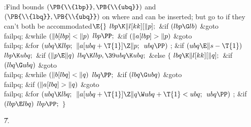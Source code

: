 \Y\B\4:Find bounds $(\PB{\\{lbp}},\PB{\\{ubq}})$ and $(\PB{\\{lbq}},\PB{%
\\{ubq}})$ on where  and  can be inserted; but go to  if they can't both be accommodated\X${}\E{}$\6
$\\{lbp}\K\|l[\\{kk}][\|p];{}$\6
\&{if} ${}(\\{lbp}\G\\{lb}){}$\1\5
\&{goto} \\{failpq};\2\6
\&{while} ${}(\|b[\\{lbp}]<\|p){}$\1\5
${}\\{lbp}\PP;{}$\2\6
\&{if} ${}(\|a[\\{lbp}]>\|p){}$\1\5
\&{goto} \\{failpq};\2\6
\&{for} ${}(\\{ubq}\K\\{lbp};{}$ ${}\|a[\\{ubq}+\T{1}]\Z\|p;{}$ ${}\\{ubq}%
\PP){}$\1\5
;\2\6
\&{if} ${}(\\{ubq}\E\|s-\T{1}){}$\1\5
${}\\{lbp}\K\\{ubq};{}$\2\6
\&{if} ${}(\|p\E\|q){}$\1\5
${}\\{lbq}\K\\{lbp},\39\\{ubq}\K\\{ubq};{}$\2\6
\&{else}\5
${}\{{}$\1\6
${}\\{lbq}\K\|l[\\{kk}][\|q];{}$\6
\&{if} ${}(\\{lbq}\G\\{ubq}){}$\1\5
\&{goto} \\{failpq};\2\6
\&{while} ${}(\|b[\\{lbq}]<\|q){}$\1\5
${}\\{lbq}\PP;{}$\2\6
\&{if} ${}(\\{lbq}\G\\{ubq}){}$\1\5
\&{goto} \\{failpq};\2\6
\&{if} ${}(\|a[\\{lbq}]>\|q){}$\1\5
\&{goto} \\{failpq};\2\6
\&{for} ${}(\\{ubq}\K\\{lbq};{}$ ${}\|a[\\{ubq}+\T{1}]\Z\|q\W\\{ubq}+\T{1}<%
\\{ubq};{}$ ${}\\{ubq}\PP){}$\1\5
;\2\6
\&{if} ${}(\\{lbp}\E\\{lbq}){}$\1\5
${}\\{lbp}\PP;{}$\2\6
\4${}\}{}$\2\par
\U7.\fi

